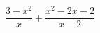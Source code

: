 \hspace*{2mm}\begin{minipage}[t]{\dimexpr\linewidth-2mm\relax}\vspace{0pt}
$\dfrac{3-x^2}{x}+\dfrac{x^2-2x-2}{x-2}$\end{minipage}
